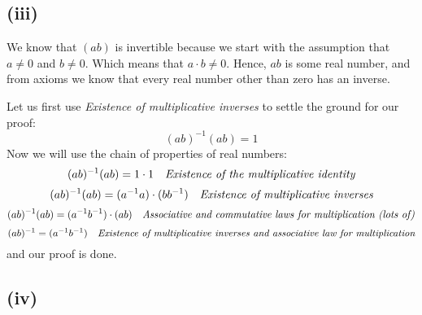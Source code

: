 \documentclass{article}
\begin{document}
\subsection*{(iii)}

We know that \((ab)\) is invertible because we start with the assumption that \(a \neq 0\) and \(b \neq 0\).
Which means that \(a \cdot b \neq 0\). Hence, \(ab\) is some real number, and from axioms we know that
every real number other than zero has an inverse.  

Let us first use \emph{Existence of multiplicative inverses} to settle the ground for our proof:
\begin{equation*}
	(ab)^{-1}(ab) = 1
\end{equation*}
Now we will use the chain of properties of real numbers:
\begin{equation*}
	(ab)^{-1}(ab) = 1 \cdot 1 \ \ \ \emph{Existence of the multiplicative identity}
\end{equation*}
\begin{equation*}
	(ab)^{-1}(ab) = (a^{-1}a) \cdot (bb^{-1}) \ \ \ \emph{Existence of multiplicative inverses}
\end{equation*}
\begin{equation*}
	(ab)^{-1}(ab) = (a^{-1}b^{-1}) \cdot (ab) \ \ \ \emph{Associative and commutative laws for multiplication (lots of)} 
\end{equation*}
\begin{equation*}
	(ab)^{-1} = (a^{-1}b^{-1}) \ \ \ \emph{Existence of multiplicative inverses and associative law for multiplication} 
\end{equation*}
and our proof is done.

\subsection*{(iv)}
\end{document}
